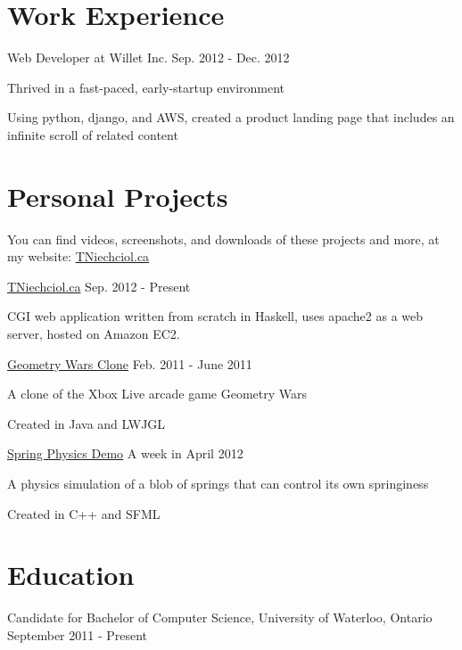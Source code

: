 \documentclass[10pt,letterpaper]{article}
\begin{document}
\section*{Work Experience}
    \begin{description}
        \item Web Developer at Willet Inc. \hfill Sep. 2012 - Dec. 2012
        \begin{description}
            \item Thrived in a fast-paced, early-startup environment
            \item Using python, django, and AWS, created a product landing page that includes an infinite scroll of related content
        \end{description}
    \end{description}

\section*{Personal Projects}
    \begin{description}
        \item You can find videos, screenshots, and downloads of these projects and more, at my website: \href{http://TNiechciol.ca}{TNiechciol.ca}
        \item \href{https://github.com/TerranceN/TNiechciol.ca}{TNiechciol.ca}
        \hfill Sep. 2012 - Present
        \begin{description}
            \item CGI web application written from scratch in Haskell, uses apache2 as a web server, hosted on Amazon EC2.
        \end{description}
        \item \href{http://tniechciol.ca/Projects/GeoWarsClone/}{Geometry Wars Clone}
        \hfill Feb. 2011 - June 2011
        \begin{description}
            \item A clone of the Xbox Live arcade game Geometry Wars
            \item Created in Java and LWJGL
        \end{description}
        \item \href{http://tniechciol.ca/Projects/SpringPhysics/}{Spring Physics Demo}
        \hfill A week in April 2012
        \begin{description}
            \item A physics simulation of a blob of springs that can control its own springiness
            \item Created in C++ and SFML
        \end{description}
    \end{description}

\section*{Education}
    \begin{description}
        \item Candidate for Bachelor of Computer Science, University of Waterloo, Ontario \hfill September 2011 - Present
    \end{description}
\end{document}
